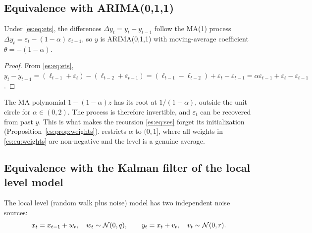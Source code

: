 \subsection{Equivalence with ARIMA(0,1,1)}

\begin{proposition}\label{es:prop:arima}
Under \eqref{es:eq:ets}, the differences $\Delta y_t = y_t - y_{t-1}$ follow the
MA(1) process $\Delta y_t = \varepsilon_t - (1-\alpha)\,\varepsilon_{t-1}$, so $y$
is ARIMA(0,1,1) with moving-average coefficient $\theta=-(1-\alpha)$.
\end{proposition}
\begin{proof}
From \eqref{es:eq:ets},
$y_t - y_{t-1} = (\ell_{t-1}+\varepsilon_t)-(\ell_{t-2}+\varepsilon_{t-1}) = (\ell_{t-1}-\ell_{t-2}) + \varepsilon_t-\varepsilon_{t-1}
= \alpha\varepsilon_{t-1}+\varepsilon_t-\varepsilon_{t-1}$.
\end{proof}

The MA polynomial $1-(1-\alpha)z$ has its root at $1/(1-\alpha)$, outside the
unit circle for $\alpha\in(0,2)$. The process is therefore invertible, and $\varepsilon_t$ can be
recovered from past $y$. This is what makes the recursion \eqref{es:eq:ses}
forget its initialization (Proposition~\ref{es:prop:weights}). 
restricts $\alpha$ to $(0,1]$, where all weights in \eqref{es:eq:weights} are
non-negative and the level is a genuine average.

\subsection{Equivalence with the Kalman filter of the local level model}

The local level (random walk plus noise) model has two independent noise sources:
\begin{equation}\label{es:eq:local-level}
  x_t = x_{t-1} + w_t,\quad w_t\sim\mathcal{N}(0,q),\qquad
  y_t = x_t + v_t,\quad v_t\sim\mathcal{N}(0,r).
\end{equation}

